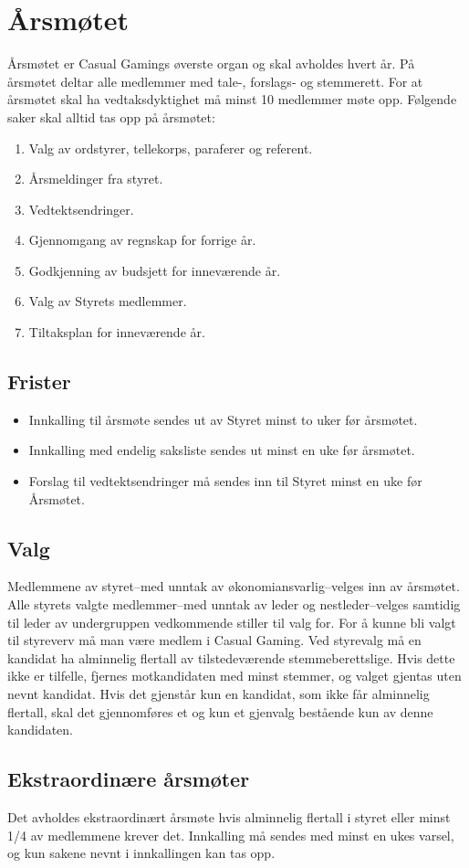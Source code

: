 \chapter{Årsmøtet}
Årsmøtet er Casual Gamings øverste organ og skal avholdes hvert år. På årsmøtet deltar alle medlemmer med tale-, forslags‐ og stemmerett. For at årsmøtet skal ha vedtaksdyktighet må minst 10 medlemmer møte opp. Følgende saker skal alltid tas opp på årsmøtet:
\begin{enumerate}
    \item Valg av ordstyrer, tellekorps, paraferer og referent.
    \item Årsmeldinger fra styret.
    \item Vedtektsendringer.
    \item Gjennomgang av regnskap for forrige år.
    \item Godkjenning av budsjett for inneværende år.
    \item Valg av Styrets medlemmer.
    \item Tiltaksplan for inneværende år.
\end{enumerate}

\section{Frister}
\begin{itemize}
    \item Innkalling til årsmøte sendes ut av Styret minst to uker før årsmøtet.
    \item Innkalling med endelig saksliste sendes ut minst en uke før årsmøtet.
    \item Forslag til vedtektsendringer må sendes inn til Styret minst en uke før Årsmøtet.
\end{itemize}

\section{Valg}
Medlemmene av styret–med unntak av økonomiansvarlig–velges inn av årsmøtet. Alle styrets valgte medlemmer–med unntak av leder og nestleder–velges samtidig til leder av undergruppen vedkommende stiller til valg for. For å kunne bli valgt til styreverv må man være medlem i Casual Gaming. Ved styrevalg må en kandidat ha alminnelig flertall av tilstedeværende stemmeberettslige. Hvis dette ikke er tilfelle, fjernes motkandidaten med minst stemmer, og valget gjentas uten nevnt kandidat. Hvis det gjenstår kun en kandidat, som ikke får alminnelig flertall, skal det gjennomføres et og kun et gjenvalg bestående kun av denne kandidaten.

\section{Ekstraordinære årsmøter}
Det avholdes ekstraordinært årsmøte hvis alminnelig flertall i styret eller minst 1/4 av medlemmene krever det. Innkalling må sendes med minst en ukes varsel, og kun sakene nevnt i innkallingen kan tas opp.

